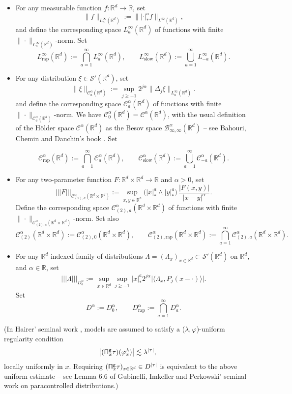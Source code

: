 \documentclass[10pt]{amsart}
\theoremstyle{plain}
\theoremstyle{definition}
\newcommand{\trino}[1]{|\!|\!|#1|\!|\!|}
\newcommand{\rap}{\mathrm{rap}}
\newcommand{\slow}{\mathrm{slow}}
\newcommand{\sfg}{\mathsf{g}}
\newcommand{\bbR}{\mathbb{R}}
\newcommand{\mcB}{\mathcal{B}}
\newcommand{\mcC}{\mathcal{C}}
\newcommand\mcS{\mathcal{S}}
\begin{document}
\begin{itemize}
	\item For any measurable function $f:\bbR^d\to\bbR$, set
\[
\|f\|_{L_a^\infty(\bbR^d)} := \big\||{\cdot}|_*^a f\big\|_{L^\infty(\bbR^d)},
\]
and define the corresponding space $L_a^\infty(\bbR^d)$ of functions with finite $\|{\cdot}\|_{L_a^\infty(\bbR^d)}$-norm. Set
\[
L_{\rap}^\infty(\bbR^d) := \bigcap_{a=1}^\infty L_a^\infty(\bbR^d), \qquad L_{\slow}^\infty(\bbR^d) := \bigcup_{a=1}^\infty L_{-a}^\infty(\bbR^d).
\]

	\item For any distribution $\xi\in\mcS'(\bbR^d)$, set
\[
\|\xi\|_{\mcC_a^\alpha(\bbR^d)} := \sup_{j\ge-1}2^{j\alpha}\|\Delta_j\xi\|_{L_a^\infty(\bbR^d)}.
\]
and define the corresponding space $\mcC_a^\alpha(\bbR^d)$ of functions with finite $\|{\cdot}\|_{\mcC_a^\alpha(\bbR^d)}$-norm. We have $\mcC^\alpha_0(\bbR^d) = \mcC^\alpha(\bbR^d)$, with the usual definition of the Hölder space $\mcC^\alpha(\bbR^d)$ as the Besov space $\mcB^\alpha_{\infty,\infty}(\bbR^d)$ -- see \eg Bahouri, Chemin and Danchin's book \cite{BCD11}. Set

\[
\mcC_\rap^\alpha(\bbR^d) := \bigcap_{a=1}^\infty \mcC_a^\alpha(\bbR^d), \qquad \mcC_\slow^\alpha(\bbR^d) := \bigcup_{a=1}^\infty \mcC_{-a}^\alpha(\bbR^d).
\]

	\item For any two-parameter function $F:\bbR^d\times\bbR^d\to\bbR$ and $\alpha>0$, set
\[
\trino{F}_{\mcC_{(2),a}^\alpha(\bbR^d\times\bbR^d)} := \sup_{x,y\in\bbR^d}\bigl(|x|_*^a\wedge|y|_*^a\bigr)\,\frac{\big|F(x,y)\big|}{|x-y|^\alpha}.
\]
Define the corresponding space $\mcC_{(2),a}^\alpha(\bbR^d\times\bbR^d)$ of functions with finite $\|{\cdot}\|_{\mcC_{(2),a}^\alpha(\bbR^d\times\bbR^d)}$-norm. Set also
\[
\mcC_{(2)}^\alpha(\bbR^d\times\bbR^d) := \mcC_{(2),0}^\alpha(\bbR^d\times\bbR^d), \qquad \mcC^\alpha_{(2),\rap}(\bbR^d\times\bbR^d) := \bigcap_{a=1}^\infty \mcC^\alpha_{(2),a}(\bbR^d\times\bbR^d).
\]

	\item For any $\bbR^d$-indexed family of distributions $\Lambda=(\Lambda_x)_{x\in\bbR^d}\subset\mcS'(\bbR^d)$ on $\bbR^d$, and $\alpha\in\bbR$, set
\begin{align*}
\trino{\Lambda}_{D_a^\alpha}:=\sup_{x\in\bbR^d}\sup_{j\ge-1}|x|_*^a2^{j\alpha}\big| \langle\Lambda_x, P_j(x-\cdot)\rangle\big|.
\end{align*}
Set\vspace*{-3pt}
\[
D^\alpha:=D_0^\alpha, \qquad D_\rap^\alpha := \bigcap_{a=1}^\infty D^\alpha_a.
\]
\end{itemize}
(In Hairer' seminal work \cite{Hai}, models are assumed to satisfy a ($\lambda, \varphi$)-uniform regularity condition\vspace*{-3pt}
\[
\big|({\sf \Pi}^{\sfg}_x\tau)(\varphi_x^\lambda)\big|\lesssim\lambda^{|\tau|},
\]
locally uniformly in $x$. Requiring $({\sf \Pi}^{\sfg}_x\tau)_{x\in\bbR^d}\in D^{|\tau|}$ is equivalent to the above uniform estimate -- see \eg Lemma 6.6 of Gubinelli, Imkeller and Perkowski' seminal work \cite{GIP} on paracontrolled distributions.)
\end{document}
